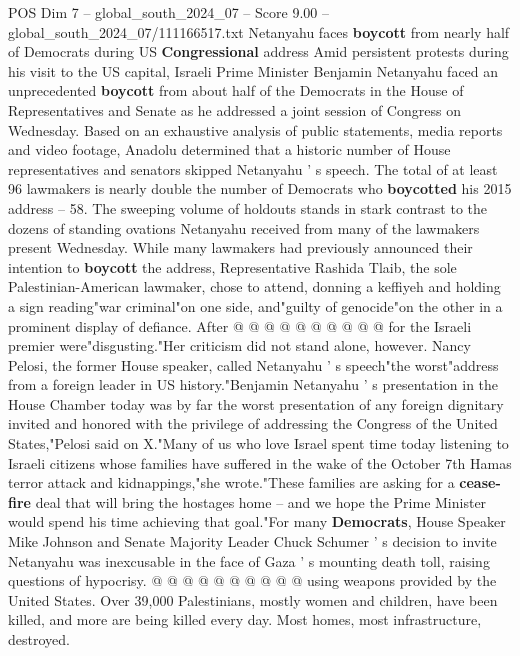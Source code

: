 \begin{textsample}{POS Dim 7 – global\_south\_2024\_07 – Score 9.00 – global\_south\_2024\_07/111166517.txt}  \label{ex:f7_pos_109}
Netanyahu faces \textbf{boycott} from nearly half of Democrats during US \textbf{Congressional} address Amid persistent protests during his visit to the US capital, Israeli Prime Minister Benjamin Netanyahu faced an unprecedented \textbf{boycott} from about half of the Democrats in the House of Representatives and Senate as he addressed a joint session of Congress on Wednesday.
Based on an exhaustive analysis of public statements, media reports and video footage, Anadolu determined that a historic number of House representatives and senators skipped Netanyahu ' s speech.
The total of at least 96 lawmakers is nearly double the number of Democrats who \textbf{boycotted} his 2015 address -- 58.
The sweeping volume of holdouts stands in stark contrast to the dozens of standing ovations Netanyahu received from many of the lawmakers present Wednesday.
While many lawmakers had previously announced their intention to \textbf{boycott} the address, Representative Rashida Tlaib, the sole Palestinian-American lawmaker, chose to attend, donning a keffiyeh and holding a sign reading"war criminal"on one side, and"guilty of genocide"on the other in a prominent display of defiance.
After @ @ @ @ @ @ @ @ @ @ for the Israeli premier were"disgusting."Her criticism did not stand alone, however.
Nancy Pelosi, the former House speaker, called Netanyahu ' s speech"the worst"address from a foreign leader in US history."Benjamin Netanyahu ' s presentation in the House Chamber today was by far the worst presentation of any foreign dignitary invited and honored with the privilege of addressing the Congress of the United States,"Pelosi said on X."Many of us who love Israel spent time today listening to Israeli citizens whose families have suffered in the wake of the October 7th Hamas terror attack and kidnappings,"she wrote."These families are asking for a \textbf{cease-fire} deal that will bring the hostages home -- and we hope the Prime Minister would spend his time achieving that goal."For many \textbf{Democrats}, House Speaker Mike Johnson and Senate Majority Leader Chuck Schumer ' s decision to invite Netanyahu was inexcusable in the face of Gaza ' s mounting death toll, raising questions of hypocrisy. @ @ @ @ @ @ @ @ @ @ using weapons provided by the United States.
Over 39,000 Palestinians, mostly women and children, have been killed, and more are being killed every day.
Most homes, most infrastructure, destroyed.

\end{textsample}

